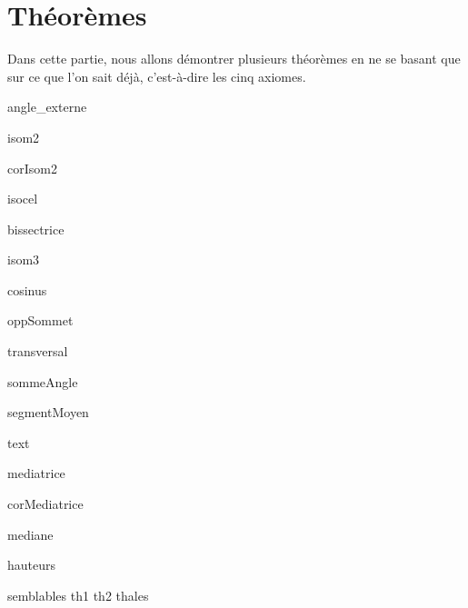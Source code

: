 \section{Théorèmes}
Dans cette partie, nous allons démontrer plusieurs théorèmes en ne se basant que sur ce que l'on sait déjà, c'est-à-dire les cinq axiomes.

{angle_externe}

{isom2}

{corIsom2}

{isocel}

{bissectrice}

{isom3}

{cosinus}

{oppSommet}

{transversal}

{sommeAngle}

{segmentMoyen}

{text}

{mediatrice}
 
{corMediatrice}

{mediane}

{hauteurs}

{semblables}
{th1}
{th2}
{thales}



